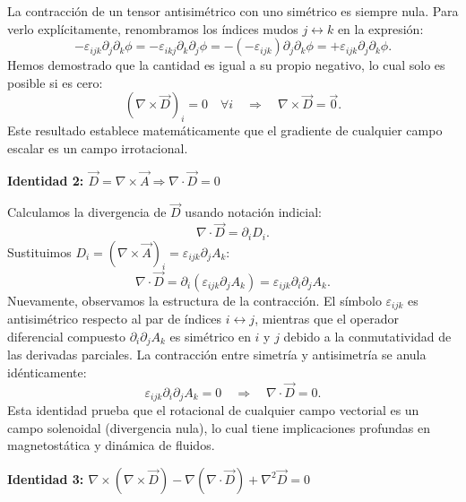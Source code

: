 \documentclass[a4paper]{article}
\begin{document}
La contracción de un tensor antisimétrico con uno simétrico es siempre nula. Para verlo explícitamente, renombramos los índices mudos $j \leftrightarrow k$ en la expresión:
$$
-\varepsilon_{ijk} \partial_j \partial_k \phi = -\varepsilon_{ikj} \partial_k \partial_j \phi = -(-\varepsilon_{ijk}) \partial_j \partial_k \phi = +\varepsilon_{ijk} \partial_j \partial_k \phi.
$$
Hemos demostrado que la cantidad es igual a su propio negativo, lo cual solo es posible si es cero:
$$
(\nabla \times \vec{D})_i = 0 \quad \forall i \quad \Rightarrow \quad \nabla \times \vec{D} = \vec{0}.
$$
Este resultado establece matemáticamente que el gradiente de cualquier campo escalar es un campo irrotacional.

\vspace{0.3cm}
\noindent\textbf{Identidad 2: $\vec{D} = \nabla \times \vec{A} \Rightarrow \nabla \cdot \vec{D} = 0$}

Calculamos la divergencia de $\vec{D}$ usando notación indicial:
$$
\nabla \cdot \vec{D} = \partial_i D_i.
$$
Sustituimos $D_i = (\nabla \times \vec{A})_i = \varepsilon_{ijk} \partial_j A_k$:
$$
\nabla \cdot \vec{D} = \partial_i (\varepsilon_{ijk} \partial_j A_k) = \varepsilon_{ijk} \partial_i \partial_j A_k.
$$
Nuevamente, observamos la estructura de la contracción. El símbolo $\varepsilon_{ijk}$ es antisimétrico respecto al par de índices $i \leftrightarrow j$, mientras que el operador diferencial compuesto $\partial_i \partial_j A_k$ es simétrico en $i$ y $j$ debido a la conmutatividad de las derivadas parciales. La contracción entre simetría y antisimetría se anula idénticamente:
$$
\varepsilon_{ijk} \partial_i \partial_j A_k = 0 \quad \Rightarrow \quad \nabla \cdot \vec{D} = 0.
$$
Esta identidad prueba que el rotacional de cualquier campo vectorial es un campo solenoidal (divergencia nula), lo cual tiene implicaciones profundas en magnetostática y dinámica de fluidos.

\vspace{0.3cm}
\noindent\textbf{Identidad 3: $\nabla \times (\nabla \times \vec{D}) - \nabla(\nabla \cdot \vec{D}) + \nabla^2 \vec{D} = 0$}
\end{document}

